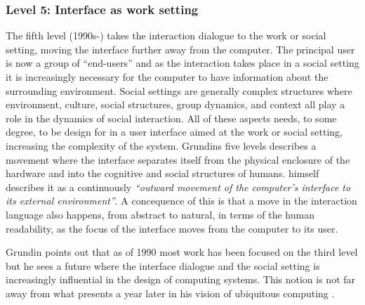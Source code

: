\subsubsection{Level 5: Interface as work setting}
The fifth level (1990s-) takes the interaction dialogue to the work or social setting, moving the interface further away from the computer.
The principal user is now a group of ``end-users'' and as the interaction takes place in a social setting it is increasingly necessary for the computer to have information about the surrounding environment.
Social settings are generally complex structures where environment, culture, social structures, group dynamics, and context all play a role in the dynamics of social interaction.
All of these aspects needs, to some degree, to be design for in a user interface aimed at the work or social setting, increasing the complexity of the system.
\blank
Grundins five levels describes a movement where the interface separates itself from the physical enclosure of the hardware and into the cognitive and social structures of humans.
\citeauthor{grudin1990computer} himself describes it as a continuously \emph{``outward movement of the computer's interface to its external environment''}.
A concequence of this is that a move in the interaction language also happens, from abstract to natural, in terms of the human readability, as the focus of the interface moves from the computer to its user.

Grundin points out that as of 1990 most work has been focused on the third level but he sees a future where the interface dialogue and the social setting is increasingly influential in the design of computing systems.
This notion is not far away from what \citeauthor{weiser1991computer} presents a year later in his vision of ubiquitous computing \citep{weiser1991computer}.

